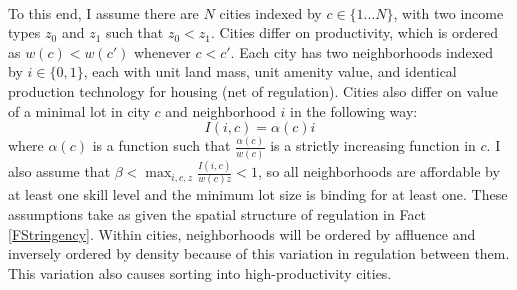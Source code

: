 \documentclass[12pt]{article}
\begin{document}
	\paragraph*{}
	To this end, I assume there are $N$ cities indexed by $c \in \{1 \dots N\}$, with two income types $z_{0}$ and $z_{1}$ such that $z_{0} < z_{1}$. Cities differ on productivity, which is ordered as $w(c) < w(c')$ whenever $c < c'$. Each city has two neighborhoods indexed by $i \in \{0,  1\}$, each with unit land mass, unit amenity value, and identical production technology for housing (net of regulation). Cities also differ on value of a minimal lot in city $c$ and neighborhood $i$ in the following way:
	\begin{equation*}
		I(i, c) = \alpha(c)i
	\end{equation*}
	where $\alpha(c)$ is a function such that $\frac{\alpha(c)}{w(c)}$ is a strictly increasing function in $c$. I also assume that $\beta < \max_{i,c, z}\frac{I(i, c)}{w(c)z} < 1$, so all neighborhoods are affordable by at least one skill level and the minimum lot size is binding for at least one. These assumptions take as given the spatial structure of regulation in Fact \ref{FStringency}. Within cities, neighborhoods will be ordered by affluence and inversely ordered by density because of this variation in regulation between them. This variation also causes sorting into high-productivity cities. 
	
\end{document}
